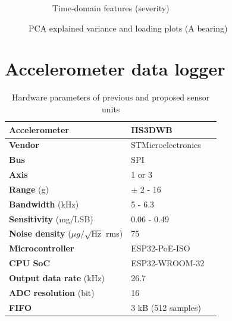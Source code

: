 \begin{figure}[h]
\begin{subfigure}[b]{0.48\textwidth}
        \caption{Time-domain features (severity)}
    \end{subfigure} 
    \caption{PCA explained variance and loading plots (A bearing)}
\end{figure}



\section{Accelerometer data logger}

\begin{table}[ht]
\renewcommand{\arraystretch}{1.2}
\centering
\begin{tabular}{|l|l|l|}
\hline
\textbf{Accelerometer}                           & \textbf{IIS3DWB}   \\ \hline
\textbf{Vendor}                                  & STMicroelectronics \\ \hline
\textbf{Bus}                                     & SPI                \\ \hline
\textbf{Axis}                                    & 1 or 3             \\ \hline
\textbf{Range} (g)                               & $\pm$ 2 - 16      \\ \hline
\textbf{Bandwidth} (kHz)                          & 5 - 6.3            \\ \hline
\textbf{Sensitivity} (mg/LSB)                    & 0.06 - 0.49       \\ \hline
\textbf{Noise density} ($\mu g / \sqrt{\mathrm{Hz}}$ rms) & 75                 \\ \hline
\textbf{Microcontroller}                         & ESP32-PoE-ISO      \\ \hline
\textbf{CPU SoC}                                 & ESP32-WROOM-32     \\ \hline
\textbf{Output data rate} (kHz)                  & 26.7               \\ \hline
\textbf{ADC resolution} (bit)                    & 16                 \\ \hline
\textbf{FIFO}                                    & 3 kB (512 samples) \\ \hline
\end{tabular}
\caption{Hardware parameters of previous and proposed sensor units}
\label{tab:design:hw-sensors}
\end{table}


